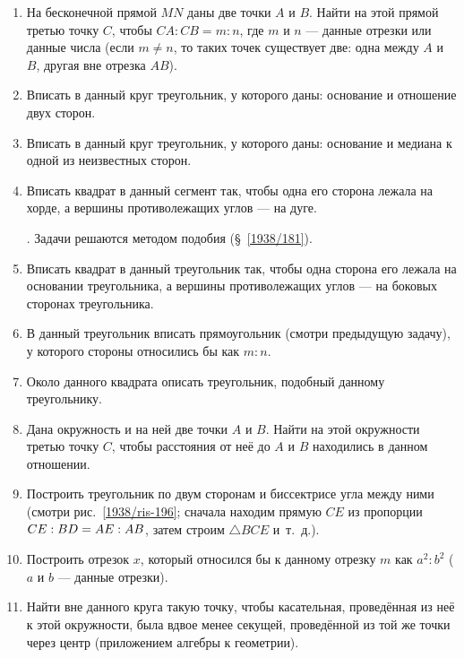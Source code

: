 {\begin{enumerate}
\item
На бесконечной прямой $MN$ даны две точки $A$ и $B$.
Найти на этой прямой третью точку $C$, чтобы $CA:CB=m:n$, где $m$ и $n$ — данные отрезки или данные числа (если $m\ne n$, то таких точек существует две:
одна между $A$ и $B$, другая вне отрезка $AB$).

\item
Вписать в данный круг треугольник, у которого даны:
основание и отношение двух сторон.

\item
Вписать в данный круг треугольник, у которого даны:
основание и медиана к одной из неизвестных сторон. 

\item
Вписать квадрат в данный сегмент так, чтобы одна его сторона лежала на хорде, а вершины противолежащих углов — на дуге.

\smallskip
{}.
Задачи решаются методом подобия (§~\ref{1938/181}).

\item
Вписать квадрат в данный треугольник так, чтобы одна сторона его лежала на основании треугольника, а вершины противолежащих углов — на боковых сторонах треугольника.

\item
В данный треугольник вписать прямоугольник (смотри предыдущую задачу), у которого стороны относились бы как $m:n$.

\item
Около данного квадрата описать треугольник, подобный данному треугольнику.

\item
Дана окружность и на ней две точки $A$ и $B$.
Найти на этой окружности третью точку $C$, чтобы расстояния от неё до $A$ и $B$ находились в данном отношении.

\item %
Построить треугольник по двум сторонам и биссектрисе угла между ними (смотри рис.~\ref{1938/ris-196};
сначала находим прямую $CE$ из пропорции $CE\z:BD\z=AE:AB$, затем строим $\triangle BCE$ и~т.~д.).

\item
Построить отрезок $x$, который относился бы к данному отрезку $m$ как $a^2:b^2$ ($a$ и $b$ — данные отрезки).

\item
Найти вне данного круга такую точку, чтобы касательная, проведённая из неё к этой окружности, была вдвое менее секущей, проведённой из той же точки через центр (приложением алгебры к геометрии).


\end{enumerate}}
